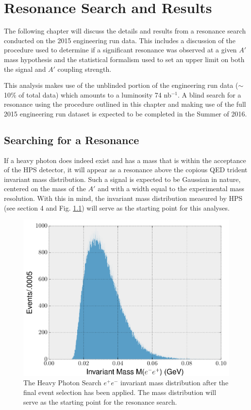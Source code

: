 
\chapter{Resonance Search and Results}

The following chapter will discuss the details and results from a resonance 
search conducted on the 2015 engineering run data.  This includes a discussion
of the procedure used to determine if a significant resonance was observed at 
a given $A'$ mass hypothesis and the statistical formalism used to set an upper
limit on both the signal and $A'$ coupling strength.

This analysis makes use of
the unblinded portion of the engineering run data ($\sim$ 10\% of total data) 
which amounts to 
a luminosity 74 nb$^{-1}$.  A blind search for a resonance using the procedure 
outlined in this chapter and making use of the full 2015 engineering run 
dataset is expected to be completed in the Summer of 2016.

\section{Searching for a Resonance}

If a heavy photon does indeed exist and has a mass that is within the acceptance
of the HPS detector, it will appear as a resonance above the copious QED trident
invariant mass distribution.  Such a signal is expected to be Gaussian in nature, 
centered on the mass of the $A'$ and with a width equal to the experimental
mass resolution. With this in mind, the invariant mass distribution measured by
HPS (see section 4 and Fig. \ref{fig:mass_distribution}) will serve as the 
starting point for this analyses.
\begin{figure}[t]
    \centering
    \includegraphics[width=1.0\textwidth]{images/invariant_mass_final.png}
    \caption{The Heavy Photon Search $e^+e^-$ invariant mass distribution after
             the final event selection has been applied.  The mass distribution
             will serve as the starting point for the resonance search.}
    \label{fig:mass_distribution}
\end{figure}

